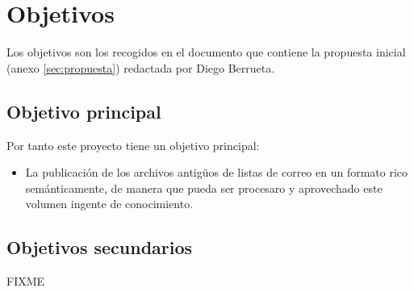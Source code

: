 
\section{Objetivos}

Los objetivos son los recogidos en el documento que contiene la propuesta 
inicial (anexo \ref{sec:propuesta}) redactada por Diego Berrueta.

\subsection{Objetivo principal}

Por tanto este proyecto tiene un objetivo principal:

\begin{itemize}
  \item La publicación de los archivos antigüos de listas de correo en un 
	formato rico semánticamente, de manera que pueda ser procesaro y
	aprovechado este volumen ingente de conocimiento.
\end{itemize}

\subsection{Objetivos secundarios}

FIXME
